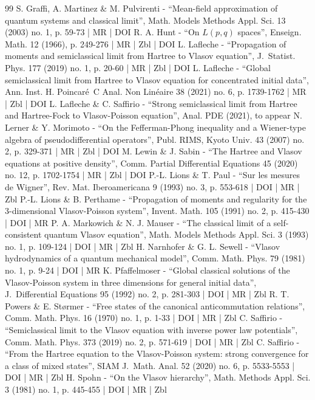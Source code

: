 \documentclass[10pt]{amsart}
\theoremstyle{definition}
\renewcommand {\(} {\lt(}
\renewcommand {\)} {\rt)}
\begin{document}
\begin{thebibliography}{99}
S. Graffi, A. Martinez \& M. Pulvirenti - “Mean-field approximation of quantum systems and classical limit”, Math. Models Methods Appl. Sci. 13 (2003) no. 1, p. 59-73 | MR | DOI
R. A. Hunt - “On $L(p,q)$ spaces”, Enseign. Math. 12 (1966), p. 249-276 | MR | Zbl | DOI
L. Lafleche - “Propagation of moments and semiclassical limit from Hartree to Vlasov equation”, J. Statist. Phys. 177 (2019) no. 1, p. 20-60 | MR | Zbl | DOI
L. Lafleche - “Global semiclassical limit from Hartree to Vlasov equation for concentrated initial data”, Ann. Inst. H. Poincaré C Anal. Non Linéaire 38 (2021) no. 6, p. 1739-1762 | MR | Zbl | DOI
L. Lafleche \& C. Saffirio - “Strong semiclassical limit from Hartree and Hartree-Fock to Vlasov-Poisson equation”, Anal. PDE (2021), to appear
N. Lerner \& Y. Morimoto - “On the Fefferman-Phong inequality and a Wiener-type algebra of pseudodifferential operators”, Publ. RIMS, Kyoto Univ. 43 (2007) no. 2, p. 329-371 | MR | Zbl | DOI
M. Lewin \& J. Sabin - “The Hartree and Vlasov equations at positive density”, Comm. Partial Differential Equations 45 (2020) no. 12, p. 1702-1754 | MR | Zbl | DOI
P.-L. Lions \& T. Paul - “Sur les mesures de Wigner”, Rev. Mat. Iberoamericana 9 (1993) no. 3, p. 553-618 | DOI | MR | Zbl
P.-L. Lions \& B. Perthame - “Propagation of moments and regularity for the 3-dimensional Vlasov-Poisson system”, Invent. Math. 105 (1991) no. 2, p. 415-430 | DOI | MR
P. A. Markowich \& N. J. Mauser - “The classical limit of a self-consistent quantum Vlasov equation”, Math. Models Methods Appl. Sci. 3 (1993) no. 1, p. 109-124 | DOI | MR | Zbl
H. Narnhofer \& G. L. Sewell - “Vlasov hydrodynamics of a quantum mechanical model”, Comm. Math. Phys. 79 (1981) no. 1, p. 9-24 | DOI | MR
K. Pfaffelmoser - “Global classical solutions of the Vlasov-Poisson system in three dimensions for general initial data”, J. Differential Equations 95 (1992) no. 2, p. 281-303 | DOI | MR | Zbl
R. T. Powers \& E. Størmer - “Free states of the canonical anticommutation relations”, Comm. Math. Phys. 16 (1970) no. 1, p. 1-33 | DOI | MR | Zbl
C. Saffirio - “Semiclassical limit to the Vlasov equation with inverse power law potentials”, Comm. Math. Phys. 373 (2019) no. 2, p. 571-619 | DOI | MR | Zbl
C. Saffirio - “From the Hartree equation to the Vlasov-Poisson system: strong convergence for a class of mixed states”, SIAM J. Math. Anal. 52 (2020) no. 6, p. 5533-5553 | DOI | MR | Zbl
H. Spohn - “On the Vlasov hierarchy”, Math. Methods Appl. Sci. 3 (1981) no. 1, p. 445-455 | DOI | MR | Zbl
\end{thebibliography}
\end{document}

